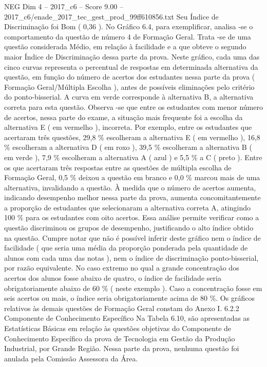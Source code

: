 \begin{textsample}{NEG Dim 4 – 2017\_c6 – Score 9.00 – 2017\_c6/enade\_2017\_tec\_gest\_prod\_99ff610856.txt}
Seu Índice de Discriminação foi Bom ( 0,36 ).
No Gráfico 6.4, para exemplificar, analisa -se o comportamento da questão de número 4 de Formação Geral.
Trata -se de uma questão considerada Médio, em relação à facilidade e a que obteve o segundo maior Índice de Discriminação dessa parte da prova.
Neste gráfico, cada uma das cinco curvas representa o percentual de respostas em determinada alternativa da questão, em função do número de acertos dos estudantes nessa parte da prova ( Formação Geral/Múltipla Escolha ), antes de possíveis eliminações pelo critério do ponto-bisserial.
A curva em verde corresponde à alternativa B, a alternativa correta para esta questão.
Observa -se que entre os estudantes com menor número de acertos, nessa parte do exame, a situação mais frequente foi a escolha da alternativa E ( em vermelho ), incorreta.
Por exemplo, entre os estudantes que acertaram três questões, 29,8 \% escolheram a alternativa E ( em vermelho ), 16,8 \% escolheram a alternativa D ( em roxo ), 39,5 \% escolheram a alternativa B ( em verde ), 7,9 \% escolheram a alternativa A ( azul ) e 5,5 \% a C ( preto ).
Entre os que acertaram três respostas entre as questões de múltipla escolha de Formação Geral, 0,5 \% deixou a questão em branco e 0,0 \% marcou mais de uma alternativa, invalidando a questão.
À medida que o número de acertos aumenta, indicando desempenho melhor nessa parte da prova, aumenta concomitantemente a proporção de estudantes que selecionaram a alternativa correta A, atingindo 100 \% para os estudantes com oito acertos.
Essa análise permite verificar como a questão discriminou os grupos de desempenho, justificando o alto índice obtido na questão.
Cumpre notar que não é possível inferir deste gráfico nem o índice de facilidade ( que seria uma média da proporção ponderada pela quantidade de alunos com cada uma das notas ), nem o índice de discriminação ponto-bisserial, por razão equivalente.
No caso extremo no qual a grande concentração dos acertos dos alunos fosse abaixo de quatro, o índice de facilidade seria obrigatoriamente abaixo de 60 \% ( neste exemplo ).
Caso a concentração fosse em seis acertos ou mais, o índice seria obrigatoriamente acima de 80 \%.
Os gráficos relativos às demais questões de Formação Geral constam do Anexo I. 6.2.2 Componente de Conhecimento Específico Na Tabela 6.10, são apresentadas as Estatísticas Básicas em relação às questões objetivas do Componente de Conhecimento Específico da prova de Tecnologia em Gestão da Produção Industrial, por Grande Região.
Nessa parte da prova, nenhuma questão foi anulada pela Comissão Assessora da Área.

\end{textsample}
